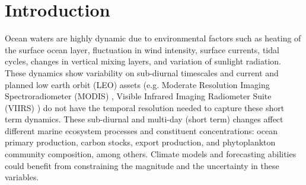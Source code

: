\documentclass[remotesensing,article,submit,moreauthors,pdftex,10pt,a4paper]{Definitions/mdpi}
\begin{document}


\section{Introduction}




Ocean waters are highly dynamic due to environmental factors such as heating of the surface ocean layer, fluctuation in wind intensity, surface currents, tidal cycles, changes in vertical mixing layers, and variation of sunlight radiation. These dynamics show variability on sub-diurnal timescales and current and planned low earth orbit (LEO) assets (e.g. Moderate Resolution Imaging Spectroradiometer (MODIS) \cite{Esaias1998}, Visible Infrared Imaging Radiometer Suite (VIIRS) \cite{Goldberg_2013}) do not have the temporal resolution needed to capture these short term dynamics. These sub-diurnal and multi-day (short term) changes affect different marine ecosystem processes and constituent concentrations: ocean primary production, carbon stocks, export production, and phytoplankton community composition, among others. Climate models and forecasting abilities could benefit from constraining the magnitude and the uncertainty in these variables. 

\end{document}
